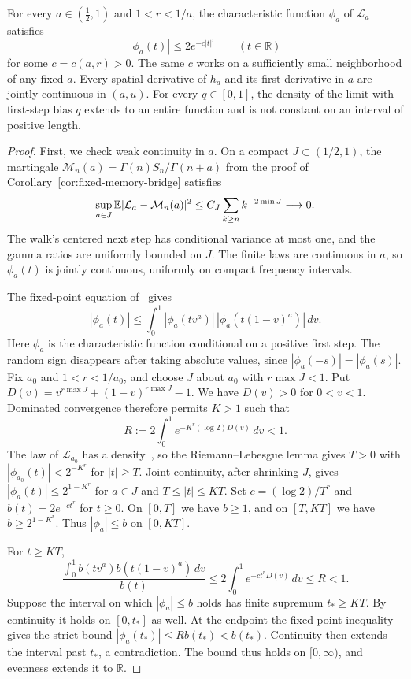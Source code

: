 \begin{lemma}\label{lem:analytic-density}
For every $a\in(\frac12,1)$ and $1<r<1/a$, the characteristic function
$\phi_a$ of $\mathcal L_a$ satisfies
\[
 |\phi_a(t)|\le 2e^{-c|t|^r}\qquad(t\in\mathbb R)
\]
for some $c=c(a,r)>0$. The same $c$ works on a sufficiently small
neighborhood of any fixed $a$. Every spatial derivative of $h_a$ and its
first derivative in $a$ are jointly continuous in $(a,u)$.
For every $q\in[0,1]$, the density of the limit with first-step bias $q$
extends to an entire function and is not constant on an interval of
positive length.
\end{lemma}

\begin{proof}
First, we check weak continuity in $a$. On a compact
$J\subset(1/2,1)$, the martingale
$\mathcal M_n(a)=\Gamma(n)S_n/\Gamma(n+a)$ from the proof of
Corollary~\ref{cor:fixed-memory-bridge} satisfies
\[
 \sup_{a\in J}\mathbb{E}|\mathcal L_a-\mathcal M_n(a)|^2
 \le C_J\sum_{k\ge n}k^{-2\min J}\longrightarrow0.
\]
The walk's centered next step has conditional variance at most one,
and the gamma ratios are uniformly bounded on $J$. The finite laws are
continuous in $a$, so $\phi_a(t)$ is jointly continuous, uniformly on
compact frequency intervals.

The fixed-point equation of~\cite[Theorem~1.1 and (2.10)]{glr2026} gives
\[
 |\phi_a(t)|\le\int_0^1|\phi_a(tv^a)|\,
                  |\phi_a(t(1-v)^a)|\,dv.
\]
Here $\phi_a$ is the characteristic function conditional on a positive
first step. The random sign disappears after taking absolute values, since
$|\phi_a(-s)|=|\phi_a(s)|$.
Fix $a_0$ and $1<r<1/a_0$, and choose $J$ about $a_0$ with $r\max J<1$.
Put $D(v)=v^{r\max J}+(1-v)^{r\max J}-1$. We have $D(v)>0$ for
$0<v<1$. Dominated convergence therefore permits $K>1$ such that
\[
 R:=2\int_0^1e^{-K^r(\log2)D(v)}\,dv<1.
\]
The law of $\mathcal L_{a_0}$ has a density~\cite[Theorem~1.3]{glr2026}, so
the Riemann--Lebesgue lemma gives $T>0$ with
$|\phi_{a_0}(t)|<2^{-K^r}$ for $|t|\ge T$. Joint continuity, after
shrinking $J$, gives $|\phi_a(t)|\le2^{1-K^r}$ for $a\in J$ and
$T\le|t|\le KT$. Set
$c=(\log2)/T^r$ and $b(t)=2e^{-ct^r}$ for $t\ge0$.
On $[0,T]$ we have $b\ge1$, and on $[T,KT]$ we have
$b\ge2^{1-K^r}$. Thus $|\phi_a|\le b$ on $[0,KT]$.

For $t\ge KT$,
\[
 \frac{\int_0^1b(tv^a)b(t(1-v)^a)\,dv}{b(t)}
 \le2\int_0^1e^{-ct^rD(v)}\,dv\le R<1.
\]
Suppose the interval on which $|\phi_a|\le b$ holds has finite
supremum $t_*\ge KT$. By continuity it holds on $[0,t_*]$ as well.
At the endpoint the fixed-point inequality gives the strict bound
$|\phi_a(t_*)|\le Rb(t_*)<b(t_*)$. Continuity then extends the
interval past $t_*$, a contradiction. The bound thus holds on
$[0,\infty)$, and evenness extends it to $\mathbb R$.


\end{proof}
